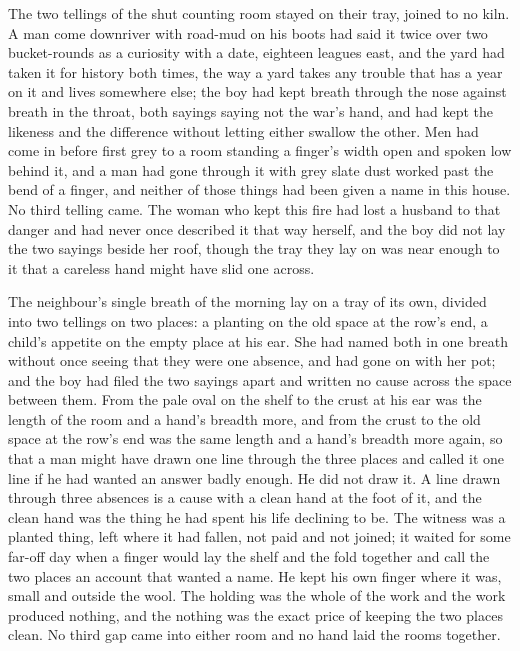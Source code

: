 The two tellings of the shut counting room stayed on their tray, joined to no kiln. A man come downriver with road-mud on his boots had said it twice over two bucket-rounds as a curiosity with a date, eighteen leagues east, and the yard had taken it for history both times, the way a yard takes any trouble that has a year on it and lives somewhere else; the boy had kept breath through the nose against breath in the throat, both sayings saying not the war's hand, and had kept the likeness and the difference without letting either swallow the other. Men had come in before first grey to a room standing a finger's width open and spoken low behind it, and a man had gone through it with grey slate dust worked past the bend of a finger, and neither of those things had been given a name in this house. No third telling came. The woman who kept this fire had lost a husband to that danger and had never once described it that way herself, and the boy did not lay the two sayings beside her roof, though the tray they lay on was near enough to it that a careless hand might have slid one across.

The neighbour's single breath of the morning lay on a tray of its own, divided into two tellings on two places: a planting on the old space at the row's end, a child's appetite on the empty place at his ear. She had named both in one breath without once seeing that they were one absence, and had gone on with her pot; and the boy had filed the two sayings apart and written no cause across the space between them. From the pale oval on the shelf to the crust at his ear was the length of the room and a hand's breadth more, and from the crust to the old space at the row's end was the same length and a hand's breadth more again, so that a man might have drawn one line through the three places and called it one line if he had wanted an answer badly enough. He did not draw it. A line drawn through three absences is a cause with a clean hand at the foot of it, and the clean hand was the thing he had spent his life declining to be. The witness was a planted thing, left where it had fallen, not paid and not joined; it waited for some far-off day when a finger would lay the shelf and the fold together and call the two places an account that wanted a name. He kept his own finger where it was, small and outside the wool. The holding was the whole of the work and the work produced nothing, and the nothing was the exact price of keeping the two places clean. No third gap came into either room and no hand laid the rooms together.

